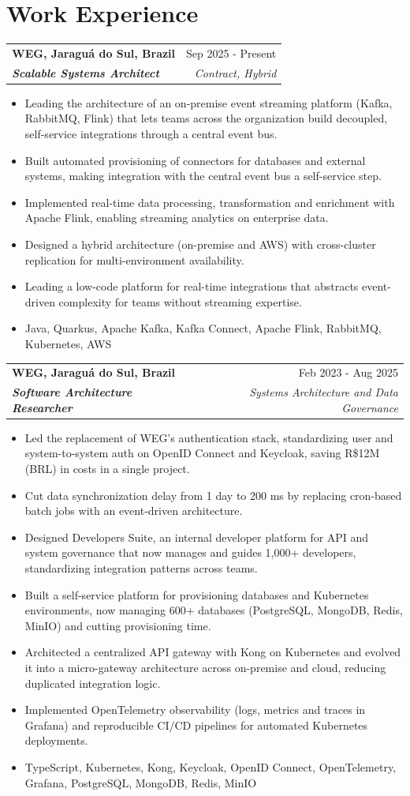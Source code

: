 \documentclass[a4paper,9pt]{extarticle}
\makeatletter
\newcommand{\role}[4]{%
  \begin{tabularx}{\linewidth}{@{}X r@{}}
    \textcolor[HTML]{1C033C}{\textbf{#1}} & \textcolor[HTML]{371e77}{#2} \\[1pt]
    \textcolor[HTML]{371e77}{\textbf{\textit{#3}}} & \textcolor[HTML]{4B28A4}{\textit{#4}} \\
  \end{tabularx}\par\vspace{1pt}%
}
\makeatother
\begin{document}
\section{Work Experience}
\role{WEG, Jaraguá do Sul, Brazil}{Sep 2025 - Present}{Scalable Systems Architect}{Contract, Hybrid}
\begin{itemize}
    \item Leading the architecture of an on-premise event streaming platform (Kafka, RabbitMQ, Flink) that lets teams across the organization build decoupled, self-service integrations through a central event bus.
    \item Built automated provisioning of connectors for databases and external systems, making integration with the central event bus a self-service step.
    \item Implemented real-time data processing, transformation and enrichment with Apache Flink, enabling streaming analytics on enterprise data.
    \item Designed a hybrid architecture (on-premise and AWS) with cross-cluster replication for multi-environment availability.
    \item Leading a low-code platform for real-time integrations that abstracts event-driven complexity for teams without streaming expertise.
    \item Java, Quarkus, Apache Kafka, Kafka Connect, Apache Flink, RabbitMQ, Kubernetes, AWS
\end{itemize}

\role{WEG, Jaraguá do Sul, Brazil}{Feb 2023 - Aug 2025}{Software Architecture Researcher}{Systems Architecture and Data Governance}
\begin{itemize}
    \item Led the replacement of WEG's authentication stack, standardizing user and system-to-system auth on OpenID Connect and Keycloak, saving R\$12M (BRL) in costs in a single project.
    \item Cut data synchronization delay from 1 day to 200 ms by replacing cron-based batch jobs with an event-driven architecture.
    \item Designed Developers Suite, an internal developer platform for API and system governance that now manages and guides 1,000+ developers, standardizing integration patterns across teams.
    \item Built a self-service platform for provisioning databases and Kubernetes environments, now managing 600+ databases (PostgreSQL, MongoDB, Redis, MinIO) and cutting provisioning time.
    \item Architected a centralized API gateway with Kong on Kubernetes and evolved it into a micro-gateway architecture across on-premise and cloud, reducing duplicated integration logic.
    \item Implemented OpenTelemetry observability (logs, metrics and traces in Grafana) and reproducible CI/CD pipelines for automated Kubernetes deployments.
    \item TypeScript, Kubernetes, Kong, Keycloak, OpenID Connect, OpenTelemetry, Grafana, PostgreSQL, MongoDB, Redis, MinIO
\end{itemize}
\end{document}
